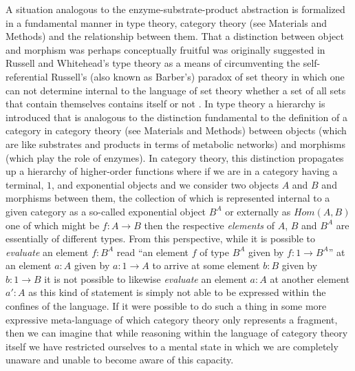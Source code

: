 A situation analogous to the enzyme-substrate-product abstraction  is formalized in a fundamental manner in type theory, category theory (see Materials and Methods) and the relationship between them. That a distinction between object and morphism was perhaps conceptually fruitful was originally suggested in Russell and Whitehead's type theory as a means of circumventing the self-referential Russell's (also known as Barber's) paradox of set theory in which one can not determine internal to the language of set theory whether a set of all sets that contain themselves contains itself or not \cite{Bell2012}. In type theory a hierarchy is introduced that is analogous to the distinction fundamental to the definition of a category in category theory (see Materials and Methods) between objects (which are like substrates and products in terms of metabolic networks) and morphisms (which play the role of enzymes). In category theory, this distinction propagates up a hierarchy of higher-order functions where if we are in a category having a terminal, $1$, and exponential objects and we consider two objects $A$ and $B$ and morphisms between them, the collection of which is represented internal to a given category as a so-called exponential object $B^A$ or externally as $Hom(A,B)$ one of which might be $f \colon A \rightarrow B$ then the respective \emph{elements} of $A$, $B$ and $B^A$ are essentially of different types. From this perspective, while it is possible to \emph{evaluate} an element $f:B^A$ read ``an element $f$ of type $B^A$ given by $f \colon 1 \rightarrow B^A$'' at an element $a:A$ given by $a \colon 1 \rightarrow A$ to arrive at some element $b:B$ given by $b \colon 1 \rightarrow B$ it is not possible to likewise \emph{evaluate} an element $a:A$ at another element $a':A$ as this kind of statement is simply not able to be expressed within the confines of the language. If it were possible to do such a thing in some more expressive meta-language of which category theory only represents a fragment, then we can imagine that while reasoning within the language of category theory itself we have restricted ourselves to a mental state in which we are completely unaware and unable to become aware of this capacity.

